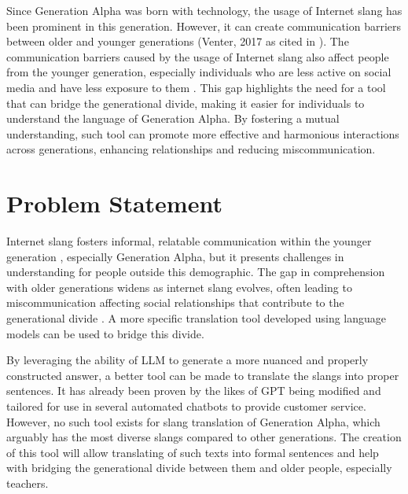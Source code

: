 Since Generation Alpha was born with technology, the usage of Internet slang has been prominent in this generation.
However, it can create communication barriers between older and younger generations (Venter, 2017 as cited in \cite{Ghazali_Abdullah_2021}).
The communication barriers caused by the usage of Internet slang also affect people from the younger generation, especially individuals who are less active on social media and have less exposure to them \cite{Vacalares_Salas_Babac_Cagalawan_Calimpong_2023}.
This gap highlights the need for a tool that can bridge the generational divide, making it easier for individuals to understand the language of Generation Alpha.
By fostering a mutual understanding, such tool can promote more effective and harmonious interactions across generations, enhancing relationships and reducing miscommunication.

\section{Problem Statement}
\label{sec:problem_statement}

Internet slang fosters informal, relatable communication within the younger generation \cite{Ghazali_Abdullah_2021}, especially Generation Alpha, but it presents challenges in understanding for people outside this demographic. 
The gap in comprehension with older generations widens as internet slang evolves, often leading to miscommunication affecting social relationships that contribute to the generational divide \cite{Vacalares_Salas_Babac_Cagalawan_Calimpong_2023}. 
A more specific translation tool developed using language models can be used to bridge this divide.

By leveraging the ability of LLM to generate a more nuanced and properly constructed answer, a better tool can be made to translate the slangs into proper sentences.
It has already been proven by the likes of GPT being modified and tailored for use in several automated chatbots to provide customer service.
However, no such tool exists for slang translation of Generation Alpha, which arguably has the most diverse slangs compared to other generations.
The creation of this tool will allow translating of such texts into formal sentences and help with bridging the generational divide between them and older people, especially teachers. 

